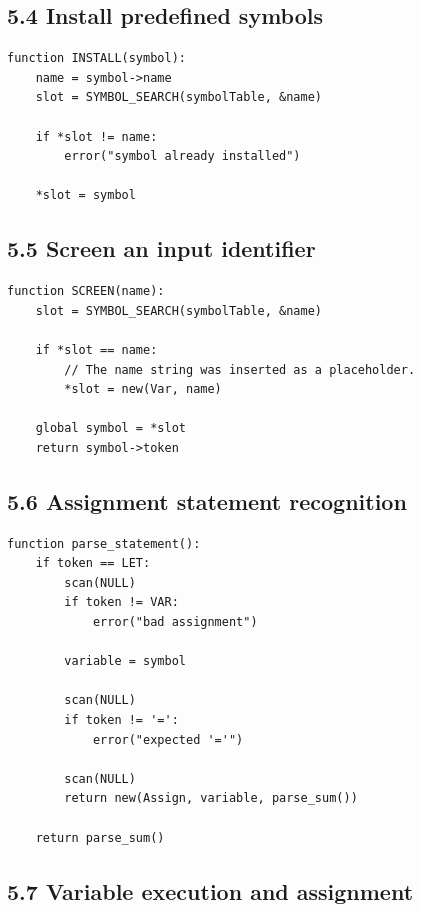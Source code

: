 \documentclass[11pt]{article}
\begin{document}
\subsection{5.4 Install predefined
symbols}\label{install-predefined-symbols}

\begin{verbatim}
function INSTALL(symbol):
    name = symbol->name
    slot = SYMBOL_SEARCH(symbolTable, &name)

    if *slot != name:
        error("symbol already installed")

    *slot = symbol
\end{verbatim}

\subsection{5.5 Screen an input
identifier}\label{screen-an-input-identifier}

\begin{verbatim}
function SCREEN(name):
    slot = SYMBOL_SEARCH(symbolTable, &name)

    if *slot == name:
        // The name string was inserted as a placeholder.
        *slot = new(Var, name)

    global symbol = *slot
    return symbol->token
\end{verbatim}

\subsection{5.6 Assignment statement
recognition}\label{assignment-statement-recognition}

\begin{verbatim}
function parse_statement():
    if token == LET:
        scan(NULL)
        if token != VAR:
            error("bad assignment")

        variable = symbol

        scan(NULL)
        if token != '=':
            error("expected '='")

        scan(NULL)
        return new(Assign, variable, parse_sum())

    return parse_sum()
\end{verbatim}

\subsection{5.7 Variable execution and
assignment}\label{variable-execution-and-assignment}
\end{document}
